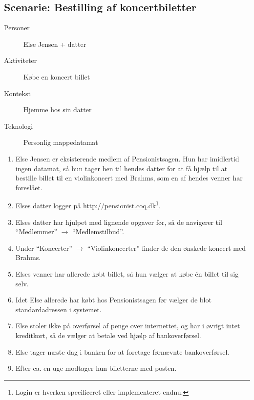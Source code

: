 \subsection{Scenarie: Bestilling af koncertbiletter}

\begin{description}
    \item[Personer] Else Jensen + datter
    \item[Aktiviteter] Købe en koncert billet
    \item[Kontekst] Hjemme hos sin datter
    \item[Teknologi] Personlig mappedatamat
\end{description}

\begin{enumerate}
    \item Else Jensen er eksisterende medlem af Pensionistsagen. Hun har
          imidlertid ingen datamat, så hun tager hen til hendes datter for at
          få hjælp til at bestille billet til en violinkoncert med Brahms,
          som en af hendes venner har foreslået.
    \item Elses datter logger på
          \url{http://pensionist.coq.dk}\footnote{Login er hverken
          specificeret eller implementeret endnu.}.
    \item Elses datter har hjulpet med lignende opgaver før, så de navigerer
          til ``Medlemmer'' $\to$ ``Medlemstilbud''.
    \item Under ``Koncerter'' $\to$ ``Violinkoncerter'' finder de den ønskede
          koncert med Brahms.
    \item Elses venner har allerede købt billet, så hun vælger at købe én
          billet til sig selv.
    \item Idet Else allerede har købt hos Pensionistsagen før vælger de blot
          standardadressen i systemet.
    \item Else stoler ikke på overførsel af penge over internettet, og
          har i øvrigt intet kreditkort, så de vælger at betale ved hjælp
          af bankoverførsel.
    \item Else tager næste dag i banken for at foretage førnævnte
          bankoverførsel.
    \item Efter ca. en uge modtager hun biletterne med posten.
\end{enumerate}
